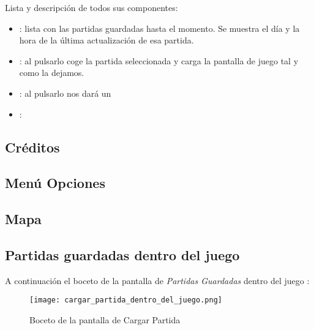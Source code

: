             Lista y descripción de todos sus componentes:
            \begin{itemize}
            \item {}: lista con las partidas guardadas hasta el momento. Se muestra el día y la hora de la última actualización de esa partida.
            \item {}: al pulsarlo coge la partida seleccionada y carga la pantalla de juego tal y como la dejamos.
            \item {}: al pulsarlo nos dará un
            \item {}:
            \end{itemize}
            
            \newpage
            \subsection{Créditos}
            
            
            \newpage
            \subsection{Menú Opciones}
        
        
            \newpage
            \subsection{Mapa}
            
            
            \newpage
            \subsection{Partidas guardadas dentro del juego}
            A continuación el boceto de la pantalla de \emph{Partidas Guardadas} dentro del juego :
            
            \begin{figure}[H] 
                \begin{center}
                    \texttt{[image: cargar\_partida\_dentro\_del\_juego.png]}
                \end{center}
                \caption{Boceto de la pantalla de Cargar Partida}
                \label{fig:cargar-partida-dentro-juego}
            \end{figure}
            
